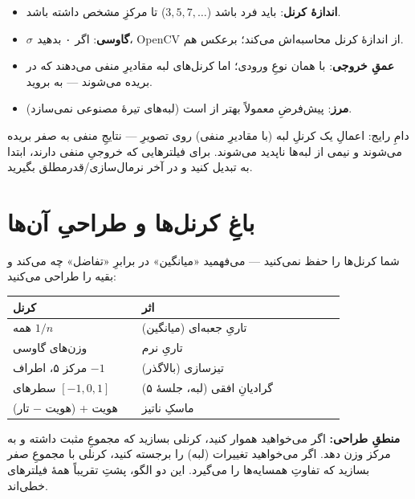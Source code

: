 \documentclass[12pt,a4paper]{article}
\begin{document}
\begin{itemize}
  \item \textbf{اندازهٔ کرنل}: باید فرد باشد ($3, 5, 7, \dots$) تا مرکزِ مشخص داشته باشد.
  \item \textbf{$\sigma$ گاوسی}: اگر ۰ بدهید، OpenCV از اندازهٔ کرنل محاسبه‌اش می‌کند؛ برعکس هم.
  \item \textbf{عمقِ خروجی}:  با  همان نوعِ ورودی؛ اما کرنل‌های لبه مقادیرِ منفی می‌دهند که در  بریده می‌شوند — به  بروید.
  \item \textbf{مرز}: پیش‌فرضِ  معمولاً بهتر از  است (لبه‌های تیرهٔ مصنوعی نمی‌سازد).
\end{itemize}

\begin{hoshdar}
دامِ رایج: اعمالِ یک کرنلِ لبه (با مقادیرِ منفی) روی تصویرِ  — نتایجِ منفی به صفر بریده
می‌شوند و نیمی از لبه‌ها ناپدید می‌شوند. برای فیلترهایی که خروجیِ منفی دارند، ابتدا به
 تبدیل کنید و در آخر نرمال‌سازی/قدرمطلق بگیرید.
\end{hoshdar}

\section{باغِ کرنل‌ها و طراحیِ آن‌ها}

شما کرنل‌ها را حفظ نمی‌کنید — می‌فهمید «میانگین» در برابرِ «تفاضل» چه می‌کند و بقیه را طراحی
می‌کنید:

\begin{center}
\begin{tabular}{>{\raggedright\arraybackslash}p{0.35\linewidth} >{\raggedright\arraybackslash}p{0.55\linewidth}}
\toprule
\textbf{کرنل} & \textbf{اثر} \\
\midrule
همه $1/n$ & تاریِ جعبه‌ای (میانگین) \\
وزن‌های گاوسی & تاریِ نرم \\
مرکز ۵، اطراف $-1$ & تیزسازی (بالاگذر) \\
سطرهای $[-1,0,1]$ & گرادیانِ افقی (لبه، جلسهٔ ۵) \\
هویت + (هویت $-$ تار) & ماسکِ ناتیز \\
\bottomrule
\end{tabular}
\end{center}

\textbf{منطقِ طراحی:} اگر می‌خواهید هموار کنید، کرنلی بسازید که مجموعِ مثبت داشته و به مرکز وزن
دهد. اگر می‌خواهید تغییرات (لبه) را برجسته کنید، کرنلی با مجموعِ صفر بسازید که تفاوتِ همسایه‌ها را
می‌گیرد. این دو الگو، پشتِ تقریباً همهٔ فیلترهای خطی‌اند.
\end{document}
